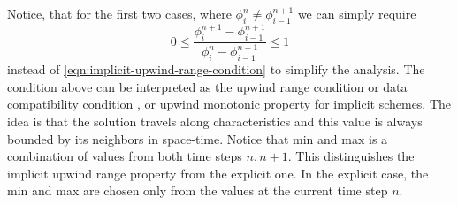 \documentclass[../thesis.tex]{subfiles}
\begin{document}
Notice, that for the first two cases, where \(\phi_{i}^{n} \neq \phi_{i-1}^{n+1}\) we can simply require
\begin{equation}\label{eqn:upwind-range-simpler}
    0
    \leq
    \frac{\phi_{i}^{n+1} - \phi_{i-1}^{n+1}}{\phi_{i}^{n} - \phi_{i-1}^{n+1}}
    \leq
    1
\end{equation}
instead of \eqref{eqn:implicit-upwind-range-condition} to simplify the analysis.
The condition above can be interpreted as the upwind range condition\cite{1998_Laney_BOOK}
or data compatibility condition \cite{2009_Toro_BOOK}, or upwind monotonic property \cite{1989_Huynh_CONF} for implicit schemes.
The idea is that the solution travels along characteristics and this value is always bounded by its neighbors in space-time.
Notice that min and max is a combination of values from both time steps \(n, n+1\).
This distinguishes the implicit upwind range property from the explicit one.
In the explicit case, the min and max are chosen only from the values at the current time step \(n\).
\end{document}
